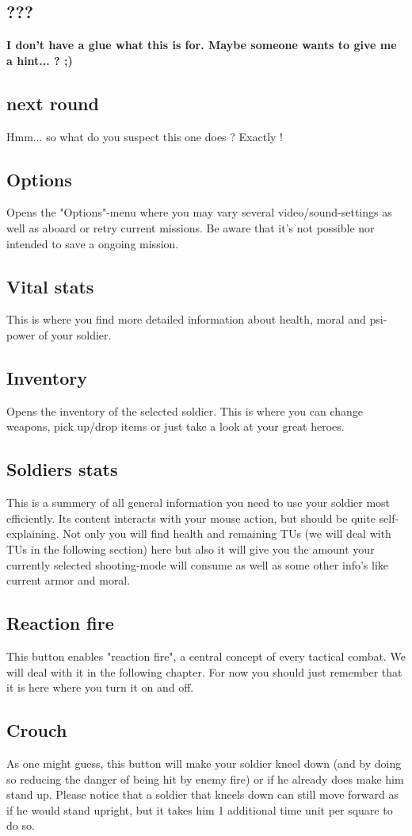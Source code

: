 \subsection{???}
\textbf{I don't have a glue what this is for. Maybe someone wants to give me a hint... ? ;)}
\subsection{next round}
Hmm... so what do you suspect this one does ? Exactly !
\subsection{Options}
Opens the "Options"-menu where you may vary several video/sound-settings as well as aboard or retry current missions. Be aware that it's not possible nor intended to save a ongoing mission.
\subsection{Vital stats}
This is where you find more detailed information about health, moral and psi-power of your soldier.
\subsection{Inventory}
Opens the inventory of the selected soldier. This is where you can change weapons, pick up/drop items or just take a look at your great heroes.
\subsection{Soldiers stats}
This is a summery of all general information you need to use your soldier most efficiently. Its content interacts with your mouse action, but should be quite self-explaining. Not only you will find health and remaining TUs (we will deal with TUs in the following section) here but also it will give you the amount your currently selected shooting-mode will consume as well as some other info's like current armor and moral.
\subsection{Reaction fire}
This button enables "reaction fire", a central concept of every tactical combat. We will deal with it in the following chapter. For now you should just remember that it is here where you turn it on and off.
\subsection{Crouch}
As one might guess, this button will make your soldier kneel down (and by doing so reducing the danger of being hit by enemy fire) or if he already does make him stand up. Please notice that a soldier that kneels down can still move forward as if he would stand upright, but it takes him 1 additional time unit per square to do so.
